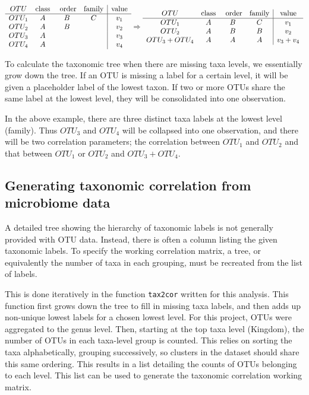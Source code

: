 \documentclass[12pt]{article}
\begin{document}
\begin{singlespace}
$$\begin{array}{c c c c | c }
  OTU & \text{class} & \text{ order} & \text{family} & \text{value}\\
  \hline
  OTU_1 & A & B & C & v_1\\
  OTU_2 & A & B & & v_2\\
  OTU_3 & A & & & v_3 \\
  OTU_4 & A & & & v_4
\end{array}
\Rightarrow
\begin{array}{c c c c | c }
  OTU & \text{class} & \text{ order} & \text{family} & \text{value}\\
  \hline
  OTU_1 & A & B & C & v_1\\
  OTU_2 & A & B & B & v_2\\
  OTU_3 + OTU_4 & A & A & A & v_3 + v_4
\end{array}
 $$
\end{singlespace}


To calculate the taxonomic tree when there are missing taxa levels, we essentially grow down the tree. If an OTU is missing a label for a certain level, it will be given a placeholder label of the lowest taxon. If two or more OTUs share the same label at the lowest level, they will be consolidated into one observation.

In the above example, there are three distinct taxa labels at the lowest level (family). Thus $OTU_3$ and $OTU_4$ will be collapsed into one observation, and there will be two correlation parameters; the correlation between $OTU_1$ and $OTU_2$ and that between $OTU_1$ or $OTU_2$ and $OTU_3 + OTU_4$.

\subsection{Generating taxonomic correlation from microbiome data}

A detailed tree showing the hierarchy of taxonomic labels is not generally provided with OTU data. Instead, there is often a column listing the given taxonomic labels. To specify the working correlation matrix, a tree, or equivalently the number of taxa in each grouping, must be recreated from the list of labels.

This is done iteratively in the function \texttt{tax2cor} written for this analysis. This function first grows down the tree to fill in missing taxa labels, and then adds up non-unique lowest labels for a chosen lowest level. For this project, OTUs were aggregated to the genus level. Then, starting at the top taxa level (Kingdom), the number of OTUs in each taxa-level group is counted. This relies on sorting the taxa alphabetically, grouping successively, so clusters in the dataset should share this same ordering. This results in a list detailing the counts of OTUs belonging to each level. This list can be used to generate the taxonomic correlation working matrix.
\end{document}
